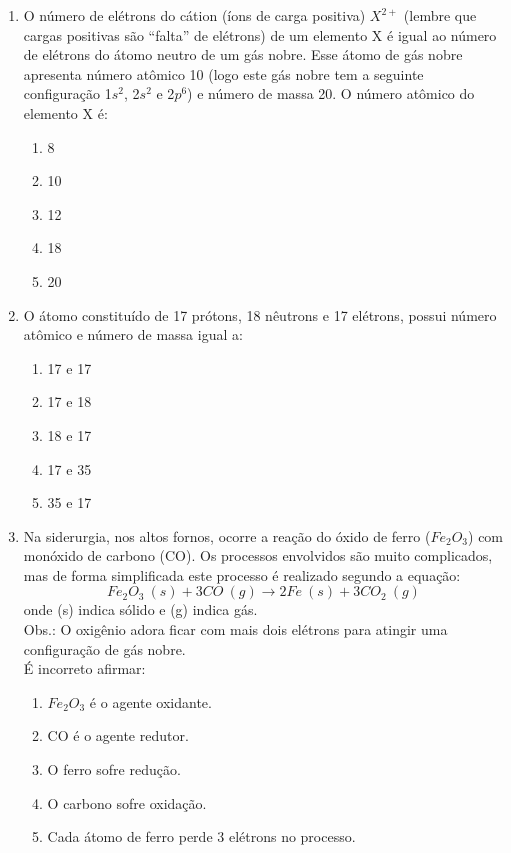 \documentclass[10pt,a4paper]{article}
\begin{document}
\begin{multicols}{2}
\begin{enumerate}
	\item O n\'umero de el\'etrons do c\'ation (íons de carga positiva) $X^{2+}$ (lembre que cargas positivas são “falta” de el\'etrons) de um elemento X \'e igual ao n\'umero de el\'etrons do \'atomo neutro de um g\'as nobre. Esse \'atomo de g\'as nobre apresenta n\'umero atômico 10 (logo este g\'as nobre tem a seguinte configura\c{c}ão 1$s^2$, 2$s^2$  e 2$p^6$) e n\'umero de massa 20. O n\'umero atômico do elemento X \'e:
		\begin{enumerate}
		\item 8
		\item 10
		\item 12
		\item 18
		\item 20
		\end{enumerate}

	\item O átomo constituído de 17 prótons, 18 nêutrons e 17 elétrons, possui número atômico e número de massa igual a:
		\begin{enumerate}
		\item 17 e 17
		\item 17 e 18
		\item 18 e 17
		\item 17 e 35
		\item 35 e 17
		\end{enumerate}

	\item Na siderurgia, nos altos fornos, ocorre a reação do óxido de ferro ($Fe_2O_3$) com monóxido de carbono (CO). Os processos envolvidos são muito complicados, mas de forma simplificada este processo é realizado segundo a equação:
		$$ Fe_2O_3 \ (s) + 3 CO \ (g) \rightarrow 2Fe \ (s) + 3 CO_2 \ (g) $$
onde (s) indica sólido e (g) indica gás. \\
Obs.: O oxigênio adora ficar com mais dois elétrons para atingir uma configuração de gás nobre. \\
É incorreto afirmar:
		\begin{enumerate}
		\item $Fe_2O_3$ é o agente oxidante.
		\item CO é o agente redutor.
		\item O ferro sofre redução.
		\item O carbono sofre oxidação.
		\item Cada átomo de ferro perde 3 elétrons no processo.
		\end{enumerate}


\end{enumerate}
\end{multicols}
\end{document}
